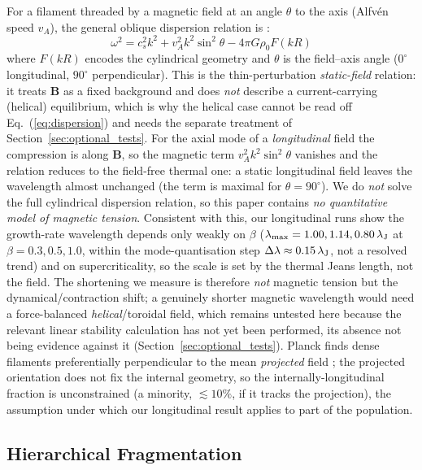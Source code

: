 \documentclass[usenatbib,twoside,twocolumn]{mnras}
\begin{document}
For a filament threaded by a magnetic field at an angle $\theta$ to the axis (Alfv\'en speed $v_A$), the general oblique dispersion relation is \citep{Nakamura1993}:
\begin{equation}
\omega^2 = c_s^2 k^2 + v_A^2 k^2 \sin^2\theta - 4\pi G\rho_0 F(kR)
\label{eq:dispersion}
\end{equation}
where $F(kR)$ encodes the cylindrical geometry and $\theta$ is the field--axis angle ($0^\circ$ longitudinal, $90^\circ$ perpendicular). This is the thin-perturbation \emph{static-field} relation: it treats $\mathbf{B}$ as a fixed background and does \emph{not} describe a current-carrying (helical) equilibrium, which is why the helical case cannot be read off Eq.~(\ref{eq:dispersion}) and needs the separate treatment of Section~\ref{sec:optional_tests}. For the axial mode of a \emph{longitudinal} field the compression is along $\mathbf{B}$, so the magnetic term $v_A^2k^2\sin^2\theta$ vanishes and the relation reduces to the field-free thermal one: a static longitudinal field leaves the wavelength almost unchanged (the term is maximal for $\theta=90^\circ$). We do \emph{not} solve the full cylindrical dispersion relation, so this paper contains \emph{no quantitative model of magnetic tension}. Consistent with this, our longitudinal runs show the growth-rate wavelength depends only weakly on $\beta$ ($\lambda_{\rm max}=1.00,1.14,0.80\,\lambda_{\rm J}$ at $\beta=0.3,0.5,1.0$, within the mode-quantisation step $\Delta\lambda\approx0.15\,\lambda_{\rm J}$, not a resolved trend) and on supercriticality, so the scale is set by the thermal Jeans length, not the field. The shortening we measure is therefore \emph{not} magnetic tension but the dynamical/contraction shift; a genuinely shorter magnetic wavelength would need a force-balanced \emph{helical}/toroidal field, which remains untested here because the relevant linear stability calculation has not yet been performed, its absence not being evidence against it (Section~\ref{sec:optional_tests}). Planck finds dense filaments preferentially perpendicular to the mean \emph{projected} field \citep{Jadhav2026}; the projected orientation does not fix the internal geometry, so the internally-longitudinal fraction is unconstrained (a minority, $\lesssim10\%$, if it tracks the projection), the assumption under which our longitudinal result applies to part of the population.

\subsection{Hierarchical Fragmentation}
\end{document}
